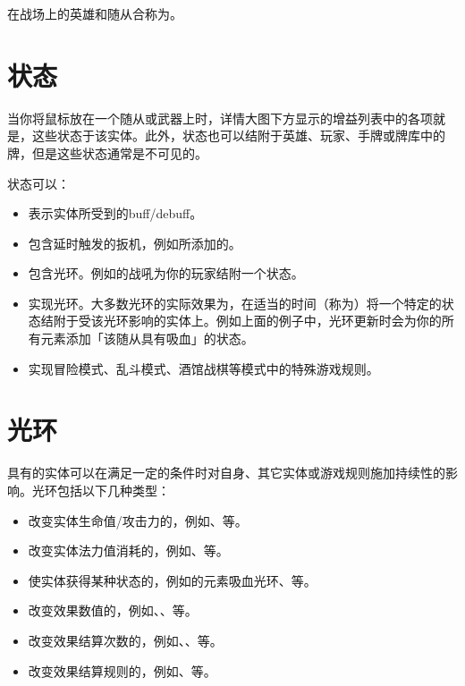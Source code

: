 在战场上的英雄和随从合称为。

\section{状态}
\label{enchantment}

当你将鼠标放在一个随从或武器上时，详情大图下方显示的增益列表中的各项就是，这些状态于该实体。此外，状态也可以结附于英雄、玩家、手牌或牌库中的牌，但是这些状态通常是不可见的。

状态可以：
\begin{itemize}
    \item 表示实体所受到的buff/debuff。
    \item 包含延时触发的扳机，例如所添加的。
    \item 包含光环。例如的战吼为你的玩家结附一个状态。
    \item 实现光环。大多数光环的实际效果为，在适当的时间（称为）将一个特定的状态结附于受该光环影响的实体上。例如上面的例子中，光环更新时会为你的所有元素添加「该随从具有吸血」的状态。
    \item 实现冒险模式、乱斗模式、酒馆战棋等模式中的特殊游戏规则。
\end{itemize}

\section{光环}
\label{aura}

具有的实体可以在满足一定的条件时对自身、其它实体或游戏规则施加持续性的影响。光环包括以下几种类型：
\begin{itemize}
    \item 改变实体生命值/攻击力的，例如、等。
    \item 改变实体法力值消耗的，例如、等。
    \item 使实体获得某种状态的，例如的元素吸血光环、等。
    \item 改变效果数值的，例如、、等。
    \item 改变效果结算次数的，例如、、等。
    \item 改变效果结算规则的，例如、等。
\end{itemize}

